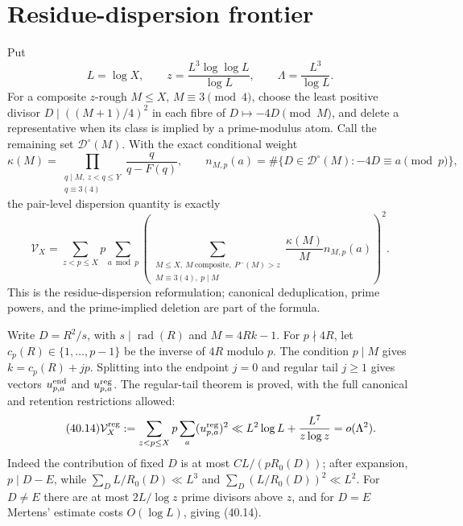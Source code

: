 \documentclass[10pt,reqno]{amsart}
\theoremstyle{definition}
\newcommand{\rad}{\operatorname {rad}}
\newcommand{\1}{\mathbf 1}
\begin{document}
\section{Residue-dispersion frontier}\label{sec:dispersion-frontier}
Put
\[
 L=\log X,\qquad z=\frac{L^3\log\log L}{\log L},\qquad
 \Lambda=\frac{L^3}{\log L}.
\]
For a composite $z$-rough $M\leq X$, $M\equiv3\pmod4$, choose the least
positive divisor $D\mid((M+1)/4)^2$ in each fibre of
$D\mapsto-4D\pmod M$, and delete a representative when its class is implied
by a prime-modulus atom.  Call the remaining set $\mathcal D^\circ(M)$.
With the exact conditional weight
\[
 \kappa(M)=\prod_{\substack{q\mid M,\ z<q\leq Y\\q\equiv3(4)}}
                \frac q{q-F(q)},
 \qquad
 n_{M,p}(a)=\#\{D\in\mathcal D^\circ(M):-4D\equiv a\pmod p\},
\]
the pair-level dispersion quantity is exactly
\begin{equation}\tag{40.5}
 \mathcal V_X=\sum_{z<p\leq X}p\sum_{a\bmod p}
 \left(\sum_{\substack{M\leq X,
      \ M\ \text{composite},\ P^-(M)>z\\
      M\equiv3(4),\ p\mid M}}
      \frac{\kappa(M)}M n_{M,p}(a)\right)^2.
\end{equation}
This is the residue-dispersion reformulation; canonical deduplication,
prime powers, and the prime-implied deletion are part of the formula.

Write $D=R^2/s$, with $s\mid\rad(R)$ and $M=4Rk-1$.  For
$p\nmid4R$, let $c_p(R)\in\{1,\ldots,p-1\}$ be the inverse of $4R$ modulo
$p$.  The condition $p\mid M$ gives $k=c_p(R)+jp$.  Splitting into the
endpoint $j=0$ and regular tail $j\geq1$ gives vectors
$u^{\rm end}_{p,a}$ and $u^{\rm reg}_{p,a}$.  The regular-tail theorem is
proved, with the full canonical and retention restrictions allowed:
\begin{equation}\tag{40.14}
 \mathcal V_X^{\rm reg}
 :=\sum_{z<p\leq X}p\sum_a(u^{\rm reg}_{p,a})^2
 \ll L^2\log L+\frac{L^7}{z\log z}=o(\Lambda^2).
\end{equation}
Indeed the contribution of fixed $D$ is at most $CL/(pR_0(D))$; after
expansion, $p\mid D-E$, while
$\sum_D L/R_0(D)\ll L^3$ and
$\sum_D(L/R_0(D))^2\ll L^2$.  For $D\ne E$ there are at most
$2L/\log z$ prime divisors above $z$, and for $D=E$ Mertens' estimate costs
$O(\log L)$, giving (40.14).
\end{document}
